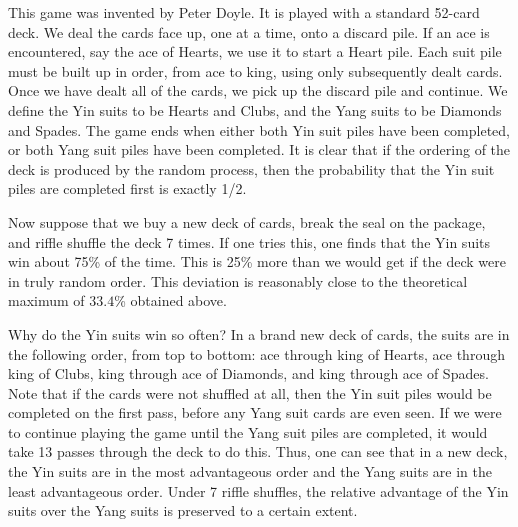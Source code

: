 This game was invented by Peter Doyle.  It is played with a standard 52-card deck.  We deal the
cards face up, one at a time, onto a discard pile.  If an ace is encountered, say the ace of Hearts,
we use  it to start a Heart pile.  Each suit pile must be built up in order, from ace to king,
using only subsequently dealt cards.  Once we have dealt all of the cards, we pick up
the discard pile and continue.  We define the Yin suits to be Hearts and Clubs, and
the Yang suits to be Diamonds and Spades.  The game ends when either both Yin suit
piles have been completed, or both Yang suit piles have been completed.  It is clear
that if the ordering of the deck is produced by the random process, then the
probability that the Yin suit piles are completed first is exactly 1/2.
\par Now suppose that we buy a new deck of cards, break the seal on the package, and
riffle shuffle the deck 7 times.  If one tries this, one finds that the Yin suits win
about 75\% of the time.  This is 25\% more than we would get if the deck were in truly
random order.   This deviation is reasonably close to the theoretical maximum of
$33.4$\% obtained above.
\par Why do the Yin suits  win so often?  In a brand new deck of cards, the suits are
in the following order, from top to bottom:  ace through king of Hearts, ace through
king of Clubs, king through ace of Diamonds, and king through ace of Spades.  Note
that if the cards were not shuffled at all, then the Yin suit piles would be completed
on the first pass, before any Yang suit cards are even seen.  If we were to continue
playing the game until the Yang suit piles are completed, it would take 13 passes
through the deck to do this.  Thus, one can see that in a new deck, the Yin suits are
in the most advantageous order and the Yang suits are in the least advantageous
order.  Under 7 riffle shuffles, the relative advantage of the Yin suits over the Yang
suits is preserved to a certain extent.

